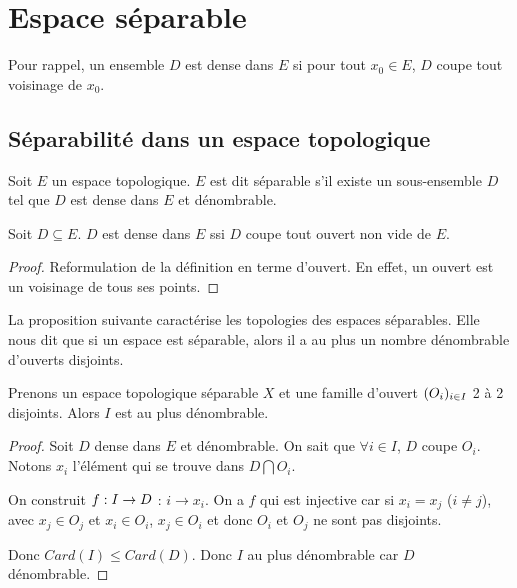 \chapter{Espace séparable}

Pour rappel, un ensemble $D$ est dense dans $E$ si pour tout $x_{0} \in E$, $D$
coupe tout voisinage de $x_{0}$.

\section{Séparabilité dans un espace topologique}

\begin{definition}
	Soit $E$ un espace topologique.
	$E$ est dit séparable s'il existe un sous-ensemble $D$ tel que $D$ est dense
	dans $E$ et dénombrable.
\end{definition}

\begin{proposition}
	Soit $D \subseteq E$.
	$D$ est dense dans $E$ ssi $D$ coupe tout ouvert non vide de $E$.
\end{proposition}

\ifdefined\outputproof
\begin{proof}
	Reformulation de la définition en terme d'ouvert. En effet, un ouvert est un
	voisinage de tous ses points.
\end{proof}
\fi

La proposition suivante caractérise les topologies des espaces séparables. Elle
nous dit que si un espace est séparable, alors il a au plus un nombre
dénombrable d'ouverts disjoints.

\begin{proposition}
	Prenons un espace topologique séparable $X$ et une famille d'ouvert
	$(O_{i})_{i \in I}$ 2 à 2 disjoints. Alors $I$ est au plus dénombrable.
\end{proposition}

\ifdefined\outputproof
\begin{proof}
	Soit $D$ dense dans $E$ et dénombrable. On sait que $\forall i \in I$, $D$
	coupe $O_{i}$. Notons $x_{i}$ l'élément qui se trouve dans $D \bigcap
	O_{i}$.

	On construit $f : I \rightarrow D$ : $i \rightarrow x_{i}$. On a $f$ qui
	est injective car si $x_{i} = x_{j}$ ($i \neq j$), avec $x_{j} \in O_{j}$ et
	$x_{i} \in O_{i}$, $x_{j} \in O_{i}$ et donc $O_{i}$ et $O_{j}$ ne sont pas
	disjoints.

	Donc $Card(I) \leq Card(D)$. Donc $I$ au plus dénombrable car $D$ dénombrable.
\end{proof}
\fi

